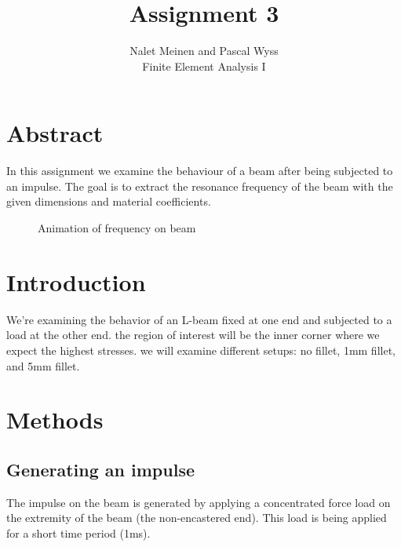 \documentclass[12pt]{article}
\begin{document}


\title{Assignment 3}%
\author{Nalet Meinen and Pascal Wyss\\ %
Finite Element Analysis I
}
\maketitle
\section*{Abstract}
In this assignment we examine the behaviour of a beam after being subjected to an impulse.
The goal is to extract the resonance frequency of the beam with the given dimensions and material coefficients.


\begin{figure}[!htb]
  \centering
  \caption{Animation of frequency on beam}
\end{figure}

\tableofcontents
\pagebreak
\section{Introduction}
We're examining the behavior of an L-beam fixed at one end and subjected 
to a load at the other end. the region of interest will be the inner 
corner where we expect the highest stresses. we will examine different 
setups: no fillet, 1mm fillet, and 5mm fillet.


\section{Methods}

\subsection{Generating an impulse}

The impulse on the beam is generated by applying a concentrated force load on the extremity of the beam (the non-encastered end).
This load is being applied for a short time period (1ms).
\end{document}
